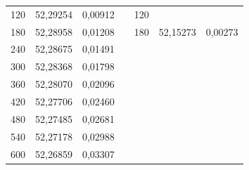 \begin{table}[]
\begin{tabular}{ccccccc}
\multicolumn{1}{|c|}{120}         & \multicolumn{1}{c|}{52,29254} & \multicolumn{1}{c|}{0,00912}        & \multicolumn{1}{c|}{} & \multicolumn{1}{c|}{120}         & \multicolumn{1}{c|}{}         & \multicolumn{1}{c|}{}               \\ \cline{1-3} \cline{5-7} 
\multicolumn{1}{|c|}{180}         & \multicolumn{1}{c|}{52,28958} & \multicolumn{1}{c|}{0,01208}        & \multicolumn{1}{c|}{} & \multicolumn{1}{c|}{180}         & \multicolumn{1}{c|}{52,15273} & \multicolumn{1}{c|}{0,00273}        \\ \cline{1-3} \cline{5-7} 
\multicolumn{1}{|c|}{240}         & \multicolumn{1}{c|}{52,28675} & \multicolumn{1}{c|}{0,01491}        & \multicolumn{1}{c|}{} & \multicolumn{1}{c|}{}            & \multicolumn{1}{c|}{}         & \multicolumn{1}{c|}{}               \\ \cline{1-3} \cline{5-7} 
\multicolumn{1}{|c|}{300}         & \multicolumn{1}{c|}{52,28368} & \multicolumn{1}{c|}{0,01798}        & \multicolumn{1}{c|}{} & \multicolumn{1}{c|}{}            & \multicolumn{1}{c|}{}         & \multicolumn{1}{c|}{}               \\ \cline{1-3} \cline{5-7} 
\multicolumn{1}{|c|}{360}         & \multicolumn{1}{c|}{52,28070} & \multicolumn{1}{c|}{0,02096}        & \multicolumn{1}{c|}{} & \multicolumn{1}{c|}{}            & \multicolumn{1}{c|}{}         & \multicolumn{1}{c|}{}               \\ \cline{1-3} \cline{5-7} 
\multicolumn{1}{|c|}{420}         & \multicolumn{1}{c|}{52,27706} & \multicolumn{1}{c|}{0,02460}        & \multicolumn{1}{c|}{} & \multicolumn{1}{c|}{}            & \multicolumn{1}{c|}{}         & \multicolumn{1}{c|}{}               \\ \cline{1-3} \cline{5-7} 
\multicolumn{1}{|c|}{480}         & \multicolumn{1}{c|}{52,27485} & \multicolumn{1}{c|}{0,02681}        & \multicolumn{1}{c|}{} & \multicolumn{1}{c|}{}            & \multicolumn{1}{c|}{}         & \multicolumn{1}{c|}{}               \\ \cline{1-3} \cline{5-7} 
\multicolumn{1}{|c|}{540}         & \multicolumn{1}{c|}{52,27178} & \multicolumn{1}{c|}{0,02988}        & \multicolumn{1}{c|}{} & \multicolumn{1}{c|}{}            & \multicolumn{1}{c|}{}         & \multicolumn{1}{c|}{}               \\ \cline{1-3} \cline{5-7} 
\multicolumn{1}{|c|}{600}         & \multicolumn{1}{c|}{52,26859} & \multicolumn{1}{c|}{0,03307}        & \multicolumn{1}{c|}{} & \multicolumn{1}{c|}{}            & \multicolumn{1}{c|}{}         & \multicolumn{1}{c|}{}               \\ \cline{1-3} \cline{5-7} 
\end{tabular}
\end{table}
 
